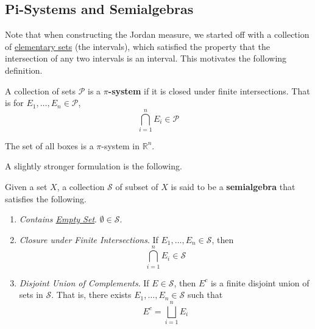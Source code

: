 \subsection{Pi-Systems and Semialgebras}

	Note that when constructing the Jordan measure, we started off with a collection of \hyperref[def:elementary-set]{elementary sets} (the intervals), which satisfied the property that the intersection of any two intervals is an interval. This motivates the following definition. 

	\begin{definition}[$\pi$-System]
	  \label{def:pi-system}
		A collection of sets $\mathcal{P}$ is a \textbf{$\pi$-system} if it is closed under finite intersections. That is for $E_1, \ldots, E_n \in \mathcal{P}$, 
		\begin{equation}
			\bigcap_{i=1}^n E_i \in \mathcal{P}
		\end{equation}
	\end{definition}

	\begin{example}
	  \label{ex:boxes-are-pi-systems-in-rn}
		The set of all boxes is a $\pi$-system in $\mathbb{R}^n$. 
	\end{example}

	A slightly stronger formulation is the following. 

  \begin{definition}[Semialgebra]
    \label{def:semialgebra}
    Given a set $X$, a collection $\mathcal{S}$ of subset of $X$ is said to be a \textbf{semialgebra} that satisfies the following. 
    \begin{enumerate}
			\item \textit{Contains \hyperref[st-def:empty-set]{Empty Set}}. $\emptyset \in \mathcal{S}$. 
			\item \textit{Closure under Finite Intersections}. If $E_1, \ldots, E_n \in \mathcal{S}$, then 
				\begin{equation}
					\bigcap_{i=1}^n E_i \in \mathcal{S}
				\end{equation}

			\item \textit{Disjoint Union of Complements}. If $E \in \mathcal{S}$, then $E^c$ is a finite disjoint union of sets in $\mathcal{S}$. That is, there exists $E_1, \ldots, E_n \in \mathcal{S}$ such that 
				\begin{equation}
					E^c = \bigsqcup_{i=1}^n E_i
				\end{equation}
    \end{enumerate}
  \end{definition}

